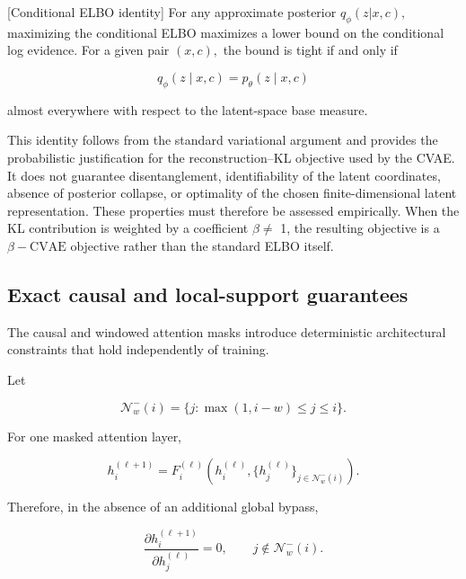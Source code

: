 [Conditional ELBO identity] For any approximate posterior \(q_{\phi} ( z | x , c ) ,\) maximizing the conditional ELBO maximizes a lower bound on the conditional log evidence. For a given pair \(( x , c ) ,\) the bound is tight if and only if

\begin{equation}
\label{eq:250}
q_{\phi}(z\mid x,c)=p_{\theta}(z\mid x,c)
\end{equation}

almost everywhere with respect to the latent-space base measure.

This identity follows from the standard variational argument \cite{kingma2014vae,sohn2015cvae} and provides the probabilistic justification for the reconstruction–KL objective used by the CVAE. It does not guarantee disentanglement, identifiability of the latent coordinates, absence of posterior collapse, or optimality of the chosen finite-dimensional latent representation. These properties must therefore be assessed empirically. When the KL contribution is weighted by a coefficient \(\beta \not =\) 1, the resulting objective is a \(\beta - \mathrm{CVAE}\) objective rather than the standard ELBO itself.

\subsection{Exact causal and local-support guarantees}
\label{sec:auxiliary_theoretical_results_exact_causal_and_local_support_guarantees}

The causal and windowed attention masks introduce deterministic architectural constraints that hold independently of training.

Let

\begin{equation}
\label{eq:251}
\mathcal N_w^{-}(i)=\{j:\max(1,i-w)\le j\le i\}.
\end{equation}

For one masked attention layer,

\begin{equation}
\label{eq:252}
h_i^{(\ell+1)}=F_i^{(\ell)}\left(h_i^{(\ell)},\{h_j^{(\ell)}\}_{j\in\mathcal N_w^{-}(i)}\right).
\end{equation}

Therefore, in the absence of an additional global bypass,

\begin{equation}
\label{eq:253}
\frac{\partial h_i^{(\ell+1)}}{\partial h_j^{(\ell)}}=0,\qquad j\notin\mathcal N_w^{-}(i).
\end{equation}

